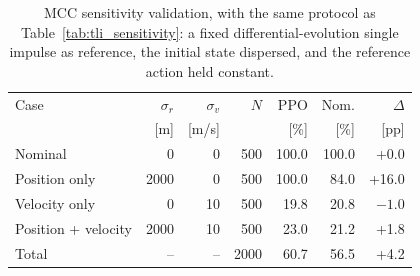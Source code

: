 \begin{table}[hbt!]
\centering
\small
\caption{MCC sensitivity validation, with the same protocol as Table~\ref{tab:tli_sensitivity}: a fixed differential-evolution single impulse as reference, the initial state dispersed, and the reference action held constant.}
\label{tab:mcc_sensitivity}
\begin{tabular}{lrrrrrr}
\toprule
Case & $\sigma_r$ & $\sigma_v$ & $N$ & PPO & Nom. & $\Delta$ \\
 & [m] & [m/s] & & [\%] & [\%] & [pp] \\
\midrule
Nominal & 0 & 0 & 500 & 100.0 & 100.0 & +0.0 \\
Position only & 2000 & 0 & 500 & 100.0 & 84.0 & +16.0 \\
Velocity only & 0 & 10 & 500 & 19.8 & 20.8 & $-1.0$ \\
Position + velocity & 2000 & 10 & 500 & 23.0 & 21.2 & +1.8 \\
\midrule
Total & -- & -- & 2000 & 60.7 & 56.5 & +4.2 \\
\bottomrule
\end{tabular}
\end{table}